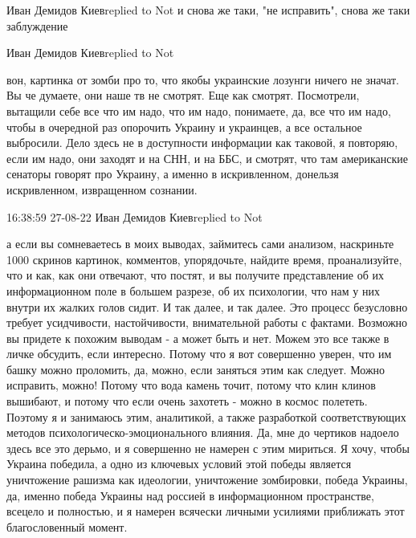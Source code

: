 Иван Демидов Киевreplied to Not
и снова же таки, "не исправить", снова же таки заблуждение

Иван Демидов Киевreplied to Not

вон, картинка от зомби про то, что якобы украинские лозунги ничего не значат.
Вы че думаете, они наше тв не смотрят. Еще как смотрят. Посмотрели, вытащили
себе все что им надо, что им надо, понимаете, да, все что им надо, чтобы в
очередной раз опорочить Украину и украинцев, а все остальное выбросили. Дело
здесь не в доступности информации как таковой, я повторяю, если им надо, они
заходят и на СНН, и на ББС, и смотрят, что там американские сенаторы говорят
про Украину, а именно в искривленном, донельзя искривленном, извращенном
сознании.

16:38:59 27-08-22 Иван Демидов Киевreplied to Not

а если вы сомневаетесь в моих выводах, займитесь сами анализом, наскриньте 1000
скринов картинок, комментов, упорядочьте, найдите время, проанализуйте, что и
как, как они отвечают, что постят, и вы получите представление об их
информационном поле в большем разрезе, об их психологии, что нам у них внутри
их жалких голов сидит. И так далее, и так далее. Это процесс безусловно требует
усидчивости, настойчивости, внимательной работы с фактами. Возможно вы придете
к похожим выводам - а может быть и нет. Можем это все также в личке обсудить,
если интересно. Потому что я вот совершенно уверен, что им башку можно
проломить, да, можно, если заняться этим как следует. Можно исправить, можно!
Потому что вода камень точит, потому что клин клинов вышибают, и потому что
если очень захотеть - можно в космос полететь. Поэтому я и занимаюсь этим,
аналитикой, а также разработкой соответствующих методов
психологическо-эмоционального влияния. Да, мне до чертиков надоело здесь все
это дерьмо, и я совершенно не намерен с этим мириться. Я хочу, чтобы Украина
победила, а одно из ключевых условий этой победы является уничтожение рашизма
как идеологии, уничтожение зомбировки, победа Украины, да, именно победа
Украины над россией в информационном пространстве, всецело и полностью, и я
намерен всячески личными усилиями приближать этот благословенный момент.
